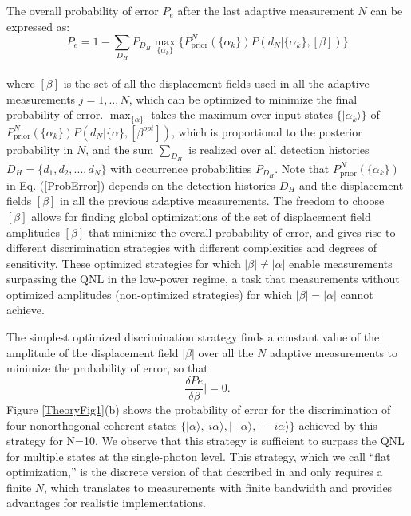 \documentclass[twocolumn,pra,preprintnumbers,amsmath,amssymb,superscriptaddress,floatfix]{revtex4}%
\begin{document}
The overall probability of error $P_{e}$ after the last adaptive
measurement $N$ can be expressed as:
\begin{equation} \label{ProbError}
P_{e}=1-\sum_{D_{H}}P_{D_{H}}\max_{\{\alpha_{k}\}}\{P^{N}_{\textrm{prior}}(\{\alpha_{k}\})P(d_{N}|\{\alpha_{k}\},[\beta])\}
\end{equation}
\\
where $[\beta]$ is the set of all the displacement fields used in
all the adaptive measurements $j=1,..,N$, which can be optimized to
minimize the final probability of error. $\max_{\{\alpha\}}$ takes
the maximum over input states  $\{|\alpha_{k}\rangle\}$ of
$P^{N}_{\textrm{prior}}(\{\alpha_{k}\})P(d_{N}|\{\alpha\},[\beta^{opt}])$,
which is proportional to the posterior probability in $N$,  and the
sum $\sum_{D_{H}}$ is realized over all detection histories
$D_{H}=\{d_{1},d_{2},...,d_{N}\}$ with occurrence probabilities
$P_{D_{H}}$. Note that $P^{N}_{\textrm{prior}}(\{\alpha_{k}\})$ in
Eq. (\ref{ProbError}) depends on the detection histories $D_{H}$ and
the displacement fields $[\beta]$ in all the previous adaptive
measurements. The freedom to choose $[\beta]$ allows for finding global
optimizations of the set of displacement field amplitudes $[\beta]$
that minimize the overall probability of error, and gives rise to
different discrimination strategies with different complexities and
degrees of sensitivity. These optimized strategies for which
$|\beta|\neq |\alpha|$ enable measurements surpassing the QNL in the
low-power regime, a task that measurements without optimized
amplitudes (non-optimized strategies) for which $|\beta|=|\alpha|$ cannot achieve.

The simplest optimized discrimination strategy finds a constant value of the
amplitude of the displacement field $|\beta|$ over
all the $N$ adaptive measurements to minimize the probability of
error, so that
\begin{equation}\label{PeFlt}
\frac{\delta Pe}{\delta\beta}|=0.
\end{equation}
Figure \ref{TheoryFig1}(b) shows the probability of error for the discrimination
of four nonorthogonal coherent states $\{|\alpha\rangle,
|i\alpha\rangle,|-\alpha\rangle,|-i\alpha\rangle\}$ achieved
by this strategy for N=10. We observe that this strategy is
sufficient to surpass the QNL for multiple states at the
single-photon level. This strategy, which we call ``flat
optimization,'' is the discrete version of that described in
\cite{muller15} and only requires a finite $N$, which translates
to measurements with finite bandwidth and provides advantages for realistic
implementations.
\end{document}
